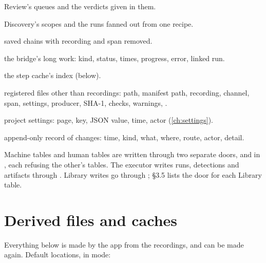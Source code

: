 \begin{description}
  Review's queues and the verdicts given in them.
\item[\code{discovery_sessions}, \code{discovery_runs}, \code{run_groups}] Discovery's scopes and the
  runs fanned out from one recipe.
\item[\code{templates}] saved chains with recording and span removed.
\item[\code{jobs}] the bridge's long work: kind, status, times, progress, error, linked run.
\item[\code{step_artifacts}] the step cache's index (below).
\item[\code{registered_artifacts}, \code{encodings}] registered files other than recordings: path,
  manifest path, recording, channel, span, settings, producer, SHA-1, checks, warnings,
  .
\item[\code{settings}] project settings: page, key, JSON value, time, actor (\cref{ch:settings}).
\item[\code{audit_log}] append-only record of changes: time, kind, what, where, route, actor, detail.
\end{description}

\begin{underthehood}
Machine tables and human tables are written through two separate doors,  and
 in , each refusing the other's tables. The executor
writes runs, detections and artifacts through . Library writes go
through ;  \S3.5 lists the door for each
Library table.
\end{underthehood}

\section{Derived files and caches}\label{sec:data-derived}
Everything below is made by the app from the recordings, and can be made again. Default locations,
in  mode:

